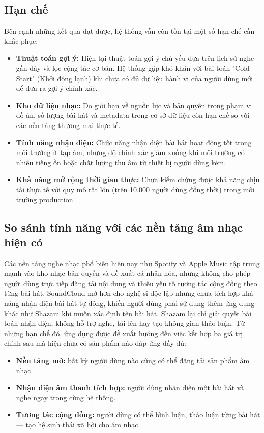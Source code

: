 \documentclass[a4paper]{article}
\newcommand{\cach}{\hspace*{1.5em}\ignorespaces}
\begin{document}
\subsection{Hạn chế}
\cach Bên cạnh những kết quả đạt được, hệ thống vẫn còn tồn tại một số hạn chế cần khắc phục:

\begin{itemize}
    \item \textbf{Thuật toán gợi ý:} Hiện tại thuật toán gợi ý chủ yếu dựa trên lịch sử nghe gần đây và lọc cộng tác cơ bản. Hệ thống gặp khó khăn với bài toán "Cold Start" (Khởi động lạnh) khi chưa có đủ dữ liệu hành vi của người dùng mới để đưa ra gợi ý chính xác.
    \item \textbf{Kho dữ liệu nhạc:} Do giới hạn về nguồn lực và bản quyền trong phạm vi đồ án, số lượng bài hát và metadata trong cơ sở dữ liệu còn hạn chế so với các nền tảng thương mại thực tế.
    \item \textbf{Tính năng nhận diện:} Chức năng nhận diện bài hát hoạt động tốt trong môi trường ít tạp âm, nhưng độ chính xác giảm xuống khi môi trường có nhiều tiếng ồn hoặc chất lượng thu âm từ thiết bị người dùng kém.
    \item \textbf{Khả năng mở rộng thời gian thực:} Chưa kiểm chứng được khả năng chịu tải thực tế với quy mô rất lớn (trên 10.000 người dùng đồng thời) trong môi trường production.
\end{itemize}

\subsection{So sánh tính năng với các nền tảng âm nhạc hiện có}
\cach Các nền tảng nghe nhạc phổ biến hiện nay như Spotify và Apple Music tập trung mạnh vào kho nhạc bản quyền và đề xuất cá nhân hóa, nhưng không cho phép người dùng trực tiếp đăng tải nội dung và thiếu yếu tố tương tác cộng đồng theo từng bài hát. SoundCloud mở hơn cho nghệ sĩ độc lập nhưng chưa tích hợp khả năng nhận diện bài hát tự động, khiến người dùng phải sử dụng thêm ứng dụng khác như Shazam khi muốn xác định tên bài hát. Shazam lại chỉ giải quyết bài toán nhận diện, không hỗ trợ nghe, tải lên hay tạo không gian thảo luận. Từ những hạn chế đó, ứng dụng được đề xuất hướng đến việc kết hợp ba giá trị chính sau mà hiện chưa có sản phẩm nào đáp ứng đầy đủ:

\begin{itemize}
	\item \textbf{Nền tảng mở:} bất kỳ người dùng nào cũng có thể đăng tải sản phẩm âm nhạc.
	\item \textbf{Nhận diện âm thanh tích hợp:} người dùng nhận diện một bài hát và nghe ngay trong cùng hệ thống.
	\item \textbf{Tương tác cộng đồng:} người dùng có thể bình luận, thảo luận từng bài hát — tạo hệ sinh thái xã hội cho âm nhạc.
\end{itemize}
\end{document}
